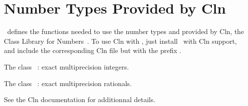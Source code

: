 \section{Number Types Provided by {\sc Cln}}
\label{CLN}


\cgal\ defines the functions needed to use the number types 
and  provided by {\sc Cln}, the Class Library for
Numbers~\cite{cln}.  To use {\sc Cln} with \cgal, just install \cgal\ with
{\sc Cln} support, and include the corresponding {\sc Cln} file but with the
prefix .


The class ~: exact multiprecision integers.


The class ~: exact multiprecision rationals.

See the {\sc Cln} documentation for additionnal details.
